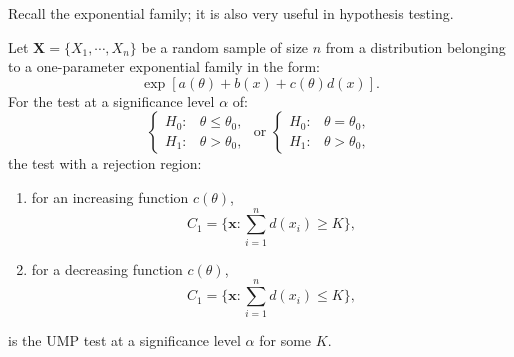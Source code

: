 \documentclass{huhtakm-template-book-v2}
\begin{document}
    Recall the exponential family; it is also very useful in hypothesis testing.
    \begin{cor}
        Let $\mathbf{X}=\{X_{1},\cdots,X_{n}\}$ be a random sample of size $n$ from a distribution belonging to a one-parameter exponential family in the form:
        \begin{equation*}
            \exp[a(\theta)+b(x)+c(\theta)d(x)].
        \end{equation*}
        For the test at a significance level $\alpha$ of:
        \begin{equation*}
            \begin{cases}
                H_{0}: &\theta\leq\theta_{0},\\
                H_{1}: &\theta>\theta_{0},
            \end{cases}\text{ or }\begin{cases}
                H_{0}: &\theta=\theta_{0},\\
                H_{1}: &\theta>\theta_{0},
            \end{cases}
        \end{equation*}
        the test with a rejection region:
        \begin{enumerate}
            \item for an increasing function $c(\theta)$,
            \begin{equation*}
                C_{1}=\biggl\{\mathbf{x}:\sum_{i=1}^{n}d(x_{i})\geq K\biggr\},
            \end{equation*}
            \item for a decreasing function $c(\theta)$,
            \begin{equation*}
                C_{1}=\biggl\{\mathbf{x}:\sum_{i=1}^{n}d(x_{i})\leq K\biggr\},
            \end{equation*}
        \end{enumerate}
        is the UMP test at a significance level $\alpha$ for some $K$.
    \end{cor}
    \newpage
    
\end{document}
